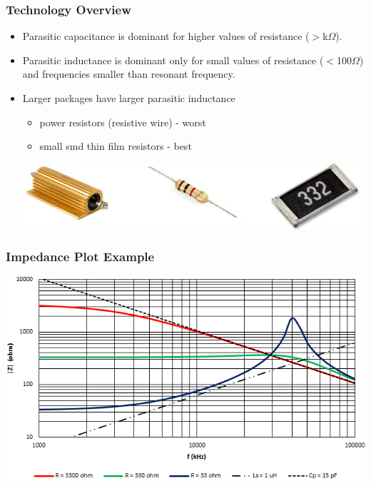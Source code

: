\documentclass{beamer}
\begin{document}
	\begin{frame}
    \frametitle{Technology Overview}
		
		\begin{itemize}
			\item Parasitic capacitance is dominant for higher values of resistance ($>$k$\Omega$).
			\item Parasitic inductance is dominant only for small values of resistance ($<$100$\Omega$) and frequencies smaller than resonant frequency.
			\item Larger packages have larger parasitic inductance
			
			\begin{itemize}
				\item power resistors (resistive wire) - worst
				\item small smd thin film resistors - best
			\end{itemize}
			\includegraphics[scale=0.4]{obr05_technR.png}
		\end{itemize}
	\end{frame}
	\begin{frame}
    \frametitle{Impedance Plot Example}

		\begin{center}
			\includegraphics[scale=0.62]{obr02_impedanceR.png}
		\end{center}
	\end{frame}
\end{document}
